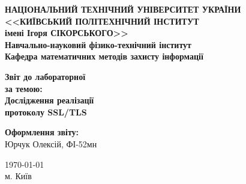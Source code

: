 \thispagestyle{empty}
\linespread{1.1}

\begin{center}
    {\bfseries\large
        НАЦІОНАЛЬНИЙ ТЕХНІЧНИЙ УНІВЕРСИТЕТ УКРАЇНИ \\
        <<КИЇВСЬКИЙ ПОЛІТЕХНІЧНИЙ ІНСТИТУТ \\
        імені Ігоря СІКОРСЬКОГО>> \\
        Навчально-науковий фізико-технічний інститут \\
        \medskip
        Кафедра математичних методів захисту інформації}
\end{center}

\begin{center}
\vspace{40mm}
{\bfseries\huge Звіт до лабораторної } \\
{\bfseries\Large за темою:} \\
{\bfseries\Large Дослідження реалізації} \\
{\bfseries\Large протоколу SSL/TLS} \\
\end{center}

\vspace{55mm}
\begin{center}
    \hfill
    \begin{minipage}[t]{0.4\textwidth}
        \begin{flushright}
            \textbf{Оформлення звіту:} \\
                Юрчук Олексій, ФІ-52мн \\
        \end{flushright}
    \end{minipage}
\end{center}

\vfill
\begin{center}
    \today \\
    {м. Київ}
\end{center}

\newpage
{}
